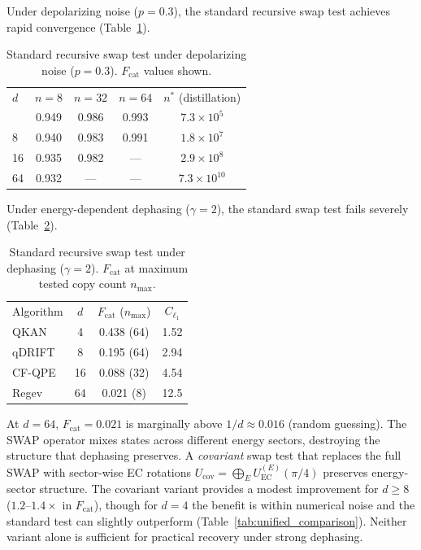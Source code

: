 \documentclass[pra,twocolumn,superscriptaddress,longbibliography,floatfix]{revtex4-2}
\begin{document}
Under depolarizing noise ($p = 0.3$), the standard recursive swap test achieves rapid convergence (Table~\ref{tab:standard_depol}).

\begin{table}[tb]
\caption{Standard recursive swap test under depolarizing noise ($p = 0.3$). $F_\mathrm{cat}$ values shown.}
\label{tab:standard_depol}
\centering\footnotesize
\setlength{\tabcolsep}{3pt}
\begin{ruledtabular}
\begin{tabular}{lcccc}
$d$ & $n = 8$ & $n = 32$ & $n = 64$ & $n^*$ (distillation) \\
\colrule
4 & 0.949 & 0.986 & 0.993 & $7.3 \times 10^5$ \\
8 & 0.940 & 0.983 & 0.991 & $1.8 \times 10^7$ \\
16 & 0.935 & 0.982 & --- & $2.9 \times 10^8$ \\
64 & 0.932 & --- & --- & $7.3 \times 10^{10}$ \\
\end{tabular}
\end{ruledtabular}
\end{table}

Under energy-dependent dephasing ($\gamma = 2$), the standard swap test fails severely (Table~\ref{tab:standard_deph}).

\begin{table}[tb]
\caption{Standard recursive swap test under dephasing ($\gamma = 2$). $F_\mathrm{cat}$ at maximum tested copy count $n_\mathrm{max}$.}
\label{tab:standard_deph}
\centering\footnotesize
\setlength{\tabcolsep}{3pt}
\begin{ruledtabular}
\begin{tabular}{lccc}
Algorithm & $d$ & $F_\mathrm{cat}$ ($n_\mathrm{max}$) & $C_{\ell_1}$ \\
\colrule
QKAN & 4 & 0.438 (64) & 1.52 \\
qDRIFT & 8 & 0.195 (64) & 2.94 \\
CF-QPE & 16 & 0.088 (32) & 4.54 \\
Regev & 64 & 0.021 (8) & 12.5 \\
\end{tabular}
\end{ruledtabular}
\end{table}

At $d = 64$, $F_\mathrm{cat} = 0.021$ is marginally above $1/d \approx 0.016$ (random guessing).
The SWAP operator mixes states across different energy sectors, destroying the structure that dephasing preserves.
A \emph{covariant} swap test that replaces the full SWAP with sector-wise EC rotations $U_\mathrm{cov} = \bigoplus_{E} U_\mathrm{EC}^{(E)}(\pi/4)$ preserves energy-sector structure.
The covariant variant provides a modest improvement for $d \geq 8$ ($1.2$--$1.4\times$ in $F_\mathrm{cat}$), though for $d = 4$ the benefit is within numerical noise and the standard test can slightly outperform (Table~\ref{tab:unified_comparison}).
Neither variant alone is sufficient for practical recovery under strong dephasing.
\end{document}

